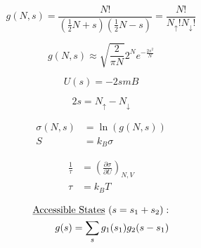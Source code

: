 \documentclass[12pt]{article}
\begin{document}
\begin{multicols}{2}

  \begin{equation*}
    g(N,s)=\frac{N!}{\left(\frac{1}{2}N+s\right)\left( \frac{1}{2}N-s \right)}=\frac{N!}{N_{\uparrow}!N_{\downarrow}!}
  \end{equation*}

  \begin{equation*}
    g(N,s)\approx \sqrt{\frac{2}{\pi N}}2^Ne^{-\frac{2s^2}{N}}
  \end{equation*}

\end{multicols}

\vspace{-20pt}

\begin{multicols}{2}

  \begin{equation*}
    U(s)=-2smB
  \end{equation*}
    
  \begin{equation*}
    2s=N_{\uparrow}-N_{\downarrow}
  \end{equation*}

\end{multicols}

\vspace{-30pt}

\begin{multicols}{2}

  \begin{equation*}
    \begin{split}
    \sigma(N,s)&=\ln(g(N,s))\\
    S&=k_B\sigma
    \end{split}
  \end{equation*}
    
  \begin{equation*}
    \begin{split}
      \frac{1}{\tau}&=\left( \frac{\partial \sigma}{\partial U} \right)_{N,V}\\
      \tau&=k_BT
    \end{split}
  \end{equation*}

\end{multicols}

\vspace{-30pt}

\begin{multicols}{2}

  \begin{equation*}
    \begin{split}
      \text{\underline{Accessible States} } (s=s_1+s_2):\\
      g(s)=\sum_s g_1(s_1)g_2(s-s_1)
    \end{split}
  \end{equation*}
    
  \begin{equation*}
  \end{equation*}

\end{multicols}
\end{document}
